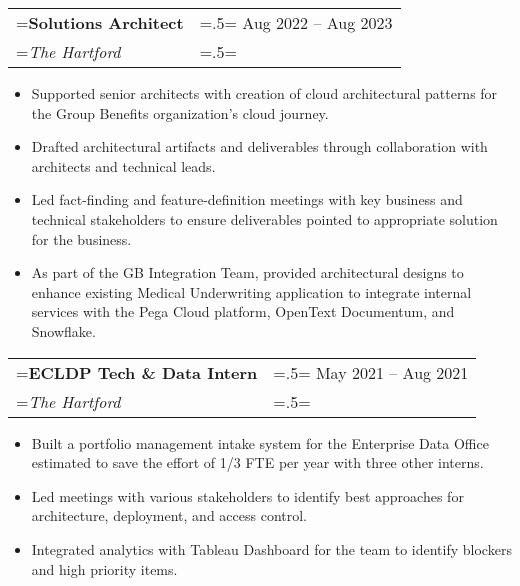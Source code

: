 \documentclass{article}
\begin{document}
\hspace{-1em}
\begin{tabularx}{\textwidth}{
    >{\raggedright\arraybackslash\hsize=1.5\hsize\linewidth=\hsize}X
    >{\raggedleft\arraybackslash\hsize=.5\hsize\linewidth=\hsize}X }
    \textbf{Solutions Architect} & Aug 2022 -- Aug 2023\\
    \textit{The Hartford} & \\
\end{tabularx}
\vspace{-.5em}
\begin{itemize}[label={--}, leftmargin=1em]
    \setlength\itemsep{0em}
    \item Supported senior architects with creation of cloud architectural patterns for the Group Benefits organization's cloud journey.
    \item Drafted architectural artifacts and deliverables through collaboration with architects and technical leads.
    \item Led fact-finding and feature-definition meetings with key business and technical stakeholders to ensure deliverables pointed to appropriate solution for the business.
    \item As part of the GB Integration Team, provided architectural designs to enhance existing Medical Underwriting application to integrate internal services with the Pega Cloud platform, OpenText Documentum, and Snowflake.
\end{itemize}

\hspace{-1em}
\begin{tabularx}{\textwidth}{
    >{\raggedright\arraybackslash\hsize=1.5\hsize\linewidth=\hsize}X
    >{\raggedleft\arraybackslash\hsize=.5\hsize\linewidth=\hsize}X }
    \textbf{ECLDP Tech \& Data Intern} & May 2021 -- Aug 2021\\
    \textit{The Hartford} & \\
\end{tabularx}
\vspace{-.5em}
\begin{itemize}[label={--}, leftmargin=1em]
    \setlength\itemsep{0em}
    \item Built a portfolio management intake system for the Enterprise Data Office estimated to save the effort of 1/3 FTE per year with three other interns.
    \item Led meetings with various stakeholders to identify best approaches for architecture, deployment, and access control.
    \item Integrated analytics with Tableau Dashboard for the team to identify blockers and high priority items.
\end{itemize}
\end{document}
